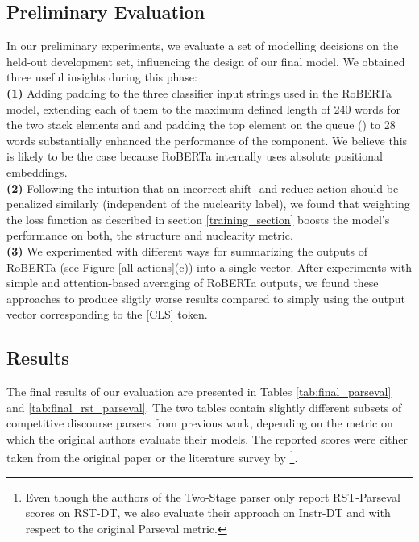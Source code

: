 \documentclass[11pt]{article}
\begin{document}
\subsection{Preliminary Evaluation} 
\label{prelim}
In our preliminary experiments, we evaluate a set of modelling decisions on the held-out development set, influencing the design of our final model. We obtained three useful insights during this phase:\\
\textbf{(1)} Adding padding to the three classifier input strings used in the RoBERTa model, extending each of them to the maximum defined length of 240 words for the two stack elements  and  and padding the top element on the queue () to 28 words  substantially enhanced the performance of the component. We believe this is likely to be the case because RoBERTa internally uses absolute positional embeddings.\\ \textbf{(2)} Following the intuition that an incorrect shift- and reduce-action should be penalized similarly (independent of the nuclearity label), we found that weighting the loss function as described in section \ref{training_section}
boosts the model's performance on both, the structure and nuclearity metric. \\\textbf{(3)} We experimented with different ways for summarizing the outputs of RoBERTa (see Figure \ref{all-actions}(c)) into a single vector. After experiments with simple and attention-based averaging of RoBERTa outputs, we found these approaches to produce sligtly worse results compared to simply using the output vector corresponding to the [CLS] token.



\subsection{Results} 
\label{results}
The final results of our evaluation are presented in Tables \ref{tab:final_parseval} and \ref{tab:final_rst_parseval}. The two tables contain slightly different subsets of competitive discourse parsers from previous work, depending on the metric on which the original authors evaluate their models.  The reported scores were either taken from the original paper or the literature survey by \footnote{Even though the authors of the Two-Stage parser only report RST-Parseval scores on RST-DT, we also evaluate their approach on Instr-DT and with respect to the original Parseval metric.}.  
\end{document}
